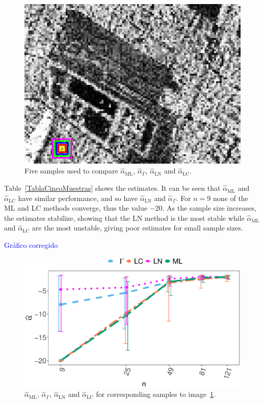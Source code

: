 \documentclass[twocolumn]{svjour3}
\begin{document}
\begin{figure}[hbt]
	\centering
	\includegraphics[width=0.7\linewidth]{../../../Figures/PaperTesis/CincoMuestras.eps}
	\caption{Five samples used to compare $\widehat{\alpha}_{\text{{ML}}}$, $\widehat{\alpha}_{\Gamma}$, $\widehat{\alpha}_{\text{{LN}}}$ and  $\widehat{\alpha}_{\text{{LC}}}$.}\label{CincoMuestras}
\end{figure}

Table~\ref{TablaCincoMuestras} shows the estimates. 
It can be seen that $\widehat{\alpha}_{\text{{ML}}}$ and $\widehat{\alpha}_{\text{{LC}}}$ have similar performance, and so have $\widehat{\alpha}_{\text{{LN}}}$ and $\widehat{\alpha}_{\Gamma}$. 
For $n= 9$ none of the ML and LC methods converge, thus the value $-20$. 
As the sample size increases, the estimates stabilize, showing that the LN method is the most stable while $\widehat{\alpha}_{\text{{ML}}}$ and $\widehat{\alpha}_{\text{{LC}}}$ are the most unstable, giving poor estimates for small sample sizes.

\textcolor{blue}{Gráfico corregido}
\begin{figure}[hbt]
	\centering
	\includegraphics[width=0.8\linewidth]{../../../Figures/PaperTesis/AlfaVsTamCincoMuestrasCorregido_v2.eps}
	\caption{ $\widehat{\alpha}_{\text{{ML}}}$, $\widehat{\alpha}_{\Gamma}$, $\widehat{\alpha}_{\text{{LN}}}$ and $\widehat{\alpha}_{\text{{LC}}}$ for corresponding samples to image~\ref{CincoMuestras}.}\label{AlfaVsTamCincoMuestras}
\end{figure}
\end{document}
